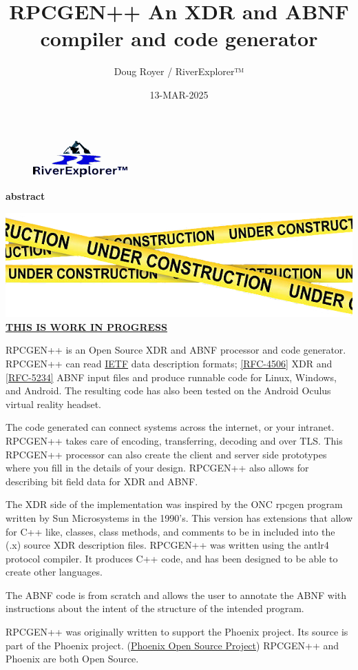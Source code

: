 \documentclass[2pt]{book}
\author{Doug Royer / RiverExplorer™}
\date{13-MAR-2025}
\title{RPCGEN++ An XDR and ABNF compiler and code generator}
\newenvironment{abstract}
{%
  \small
  \begin{center}
    \bfseries{abstract}
  \end{center}
}
{}
\begin{document}
\maketitle
\frontmatter
\begin{figure}
  \centering
  \includegraphics{RiverExplorerLLC-Logo-BLACK-131x50-Transparent.ps.png}
\end{figure}

\begin{abstract}

  \includegraphics{UnderConstruction.png}
  \underline{\textbf{THIS IS WORK IN PROGRESS}}
  
  RPCGEN++ is an Open Source XDR and ABNF processor and code generator.
  RPCGEN++ can read \href{https://ietf.org}{IETF} data description
  formats;
  \href{https://datatracker.ietf.org/doc/html/rfc4506}{[RFC-4506]}
  XDR and \href{https://datatracker.ietf.org/doc/html/rfc5234}{[RFC-5234]}
  ABNF input files and produce runnable code for Linux, Windows,
  and Android. The resulting code has also been tested on the Android
  Oculus virtual reality headset.

  The code generated can connect systems across the internet,
  or your intranet.
  RPCGEN++ takes care of encoding, transferring, decoding and over
  TLS. This RPCGEN++ processor can also create the client and server side
  prototypes where you fill in the details of your design.
  RPCGEN++ also allows for describing bit field data for XDR and ABNF.
  
  The XDR side of the implementation was inspired by the ONC
  rpcgen program written by Sun Microsystems
  in the 1990's.
  This version has extensions that allow for C++ like, classes, class
  methods, and comments to be in included into the (.x) source XDR
  description files. RPCGEN++ was written using the antlr4 protocol
  compiler. It produces C++ code, and has been designed to be able
  to create other languages.

  The ABNF code is from scratch and allows the user to annotate
  the ABNF with instructions about the intent of the structure
  of the intended program.
  
  RPCGEN++ was originally written to support the Phoenix project.
  Its source is part of the Phoenix project.
  (\href{https://github.com/RiverExplorer/Phoenix}{Phoenix Open Source Project})
  RPCGEN++ and Phoenix are both Open Source.
\end{abstract}
\tableofcontents
\listoffigures
\listoftables
\end{document}
